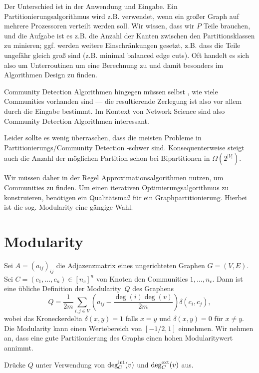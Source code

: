 Der Unterschied ist in der Anwendung und Eingabe.
Ein Partitionierungsalgorithmus wird z.B. verwendet, wenn ein großer Graph auf mehrere Prozessoren verteilt werden soll.
Wir wissen, dass wir $P$ Teile brauchen, und die Aufgabe ist es z.B. die Anzahl der Kanten zwischen den Partitionsklassen zu minieren;
ggf. werden weitere Einschränkungen gesetzt, z.B. dass die Teile ungefähr gleich groß sind (z.B. minimal balanced edge cuts).
Oft handelt es sich also um Unterroutinen um eine Berechnung zu  und damit besonders im Algorithmen Design zu finden.

Community Detection Algorithmen hingegen müssen selbst , wie viele Communities vorhanden sind ---
die resultierende Zerlegung ist also vor allem durch die Eingabe bestimmt.
Im Kontext von Network Science sind also Community Detection Algorithmen interessant.

Leider sollte es wenig überraschen, dass die meisten Probleme in Partitionierungs/Community Detection \NP-schwer sind.
Konsequenterweise steigt auch die Anzahl der möglichen Partition schon bei Bipartitionen in $\Omega(2^|V|)$.

Wir müssen daher in der Regel Approximationsalgorithmen nutzen, um Communities zu finden.
Um einen iterativen Optimierungsalgorithmus zu konstruieren, benötigen ein Qualitätsmaß für ein Graphpartitionierung.
Hierbei ist die sog. Modularity eine gängige Wahl.

\section{Modularity}
Sei $A = (a_{ij})_{ij}$ die Adjazenzmatrix eines ungerichteten Graphen $G = (V, E)$.
Sei $C = (c_1, \ldots, c_n) \in [n_c]^n$ von Knoten den Communities $1, \ldots, n_c$.
Dann ist eine übliche Definition der Modularity~$Q$ des Graphens
\begin{equation}
    Q = \frac{1}{2m} \sum_{i,j \in V} \left( a_{ij} - \frac{\deg(i)\deg(v)}{2m} \right) \delta(c_i, c_j),
\end{equation}
wobei das Kroneckerdelta $\delta(x,y) = 1$ falls $x=y$ und $\delta(x,y) = 0$ für $x \ne y$.
Die Modularity kann einen Wertebereich von $[-1/2, 1]$ einnehmen.
Wir nehmen an, dass eine gute Partitionierung des Graphs einen hohen Modularitywert annimmt.

\begin{exercise}
    Drücke $Q$ unter Verwendung von $\deg^\text{int}_C(v)$ und $\deg^\text{ext}_C(v)$ aus.
\end{exercise}

